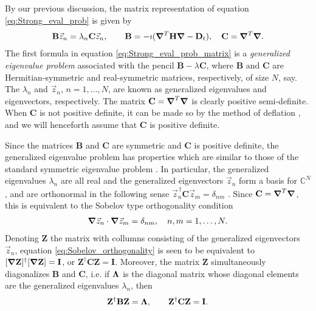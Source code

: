\documentclass[11pt]{amsart}
\newcommand{\Hb}{\mathbf{H}}
\newcommand{\Ib}{\mathbf{I}}
\newcommand{\Bb}{\mathbf{B}}
\newcommand{\Cb}{\mathbf{C}}
\newcommand{\Db}{\mathbf{D}}
\newcommand{\Zb}{\mathbf{Z}}
\newcommand\bLambda{\mbox{\boldmath${\Lambda}$}}
\newcommand\Bnabla{\mbox{\boldmath${\nabla}$}}
\begin{document}
By our previous discussion, the matrix representation of equation
\eqref{eq:Strong_eval_prob} is given by
%
\begin{align}\label{eq:Strong_eval_prob_matrix}
  \Bb\vec{z}_n=\lambda_n\Cb\vec{z}_n, \qquad
  \Bb=-\imath(\Bnabla^T\Hb\Bnabla-\Db_t), \quad
  \Cb=\Bnabla^T\Bnabla.
\end{align}
%
The first formula in equation \eqref{eq:Strong_eval_prob_matrix} is a
\emph{generalized eigenvalue problem} \cite{Parlett:1980} associated
with the pencil $\Bb-\lambda\Cb$, where $\Bb$ and $\Cb$ are
Hermitian-symmetric and real-symmetric matrices, respectively, of size
$N$, say. The $\lambda_n$ and $\vec{z}_n$, $n=1,\ldots,N$, are known as
generalized eigenvalues and eigenvectors, respectively. The matrix
$\Cb=\Bnabla^T\Bnabla$ is clearly positive semi-definite. When $\Cb$
is not positive definite, it can be made so by the method of deflation
\cite{Parlett:1980}, and 
we will henceforth assume that $\Cb$ is positive definite.



Since the matrices $\Bb$ and $\Cb$ are symmetric and $\Cb$ is
positive definite, the generalized eigenvalue problem has properties
which are similar to those of the standard symmetric eigenvalue
problem \cite{Parlett:1980}. In particular, the generalized
eigenvalues $\lambda_n$ are all real and the generalized eigenvectors
$\vec{z}_n$ form a basis for $\mathbb{C}^N$, and are orthonormal in
the following sense $\vec{z}_n^{\,\dagger}\Cb\vec{z}_m=\delta_{nm}$
\cite{Parlett:1980}. Since $\Cb=\Bnabla^T\Bnabla$, this is equivalent
to the Sobelov type orthogonality condition  
%
\begin{align}\label{eq:Sobelov_orthogonality}
  \Bnabla\vec{z}_n\cdot\Bnabla\vec{z}_m=\delta_{nm}, \quad
  n,m=1,\ldots,N.
\end{align}
%
Denoting $\Zb$ the matrix with collumns consisting of the generalized
eigenvectors $\vec{z}_n$, equation \eqref{eq:Sobelov_orthogonality} is
seen to be equivalent to $[\Bnabla\Zb]^\dagger[\Bnabla\Zb]=\Ib$, or
$\Zb^\dagger\Cb\Zb=\Ib$. Moreover, the matrix $\Zb$ simultaneously
diagonalizes $\Bb$ and $\Cb$, i.e. if $\bLambda$ is the diagonal
matrix whose diagonal elements are the generalized eigenvalues $\lambda_n$,
then \cite{Parlett:1980}
% 
\begin{align}\label{eq:Simultaneous_Diag}
  \Zb^\dagger\Bb\Zb=\bLambda, \qquad
  \Zb^\dagger\Cb\Zb=\Ib.
\end{align}
%
\end{document}
